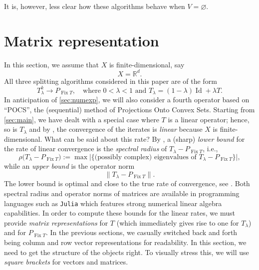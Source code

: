 \documentclass[11pt]{article}
\newcommand{\RR}{\ensuremath{\mathbb R}}
\newcommand{\Fix}{\ensuremath{\operatorname{Fix}}}
\newcommand{\Id}{\ensuremath{\operatorname{Id}}}
\theoremstyle{definition}
\providecommand{\RR}{\mathbb{R}}
\providecommand{\Id}{\operatorname{{ Id}}}
\providecommand{\Id}{\operatorname{Id}}
\providecommand{\RR}{\mathbb{R}}
\begin{document}
{It is, however, less clear how these algorithms  behave  when $V=\varnothing$. 

\section{Matrix representation}


\label{sec:matrix}

In this section, we assume that $X$ is finite-dimensional,
say 
\begin{equation*}
X=\RR^d.
\end{equation*}
All three splitting algorithms considered in this paper are of the form 
\begin{equation}
\label{e:210818a}
T_\lambda^k\to P_{\Fix T}, 
\quad\text{where $0<\lambda<1$ and $T_\lambda = (1-\lambda)\Id+\lambda T$.}%
\end{equation}
{\color{black} In anticipation of \cref{sec:numexp}, 
we will also consider a fourth operator based on ``POCS'', the (sequential) method of Projections Onto Convex Sets.}
Starting from \cref{sec:main}, we have dealt with a special case where 
$T$ is a linear operator; hence, so is $T_\lambda$ and 
by \cite[Corollary~2.8]{BLM}, the convergence of the iterates 
is \emph{linear} because $X$ is finite-dimensional. 
What can be said about this rate?
By \cite[Theorem~2.12(ii) and Theorem~2.18]{BBCNPW2}, a (sharp) 
\emph{lower bound} for the rate of linear 
convergence is the \emph{spectral radius} of $T_\lambda - P_{\Fix T}$, i.e., 
\begin{equation*}
\rho\big(T_\lambda- P_{\Fix T}\big) :=
\max \big|\{\text{(possibly complex) eigenvalues of $T_\lambda- P_{\Fix T}$}\}\big|,
\end{equation*}
while an \emph{upper bound} is the operator norm
\begin{equation*}
\big\|T_\lambda- P_{\Fix T}\big\|. 
\end{equation*}
The lower bound is optimal and close to the true rate of convergence, 
see \cite[Theorem~2.12(i)]{BBCNPW2}.
Both spectral radius and operator norms of matrices are available
in programming languages such as \texttt{Julia} \cite{Julia} which features 
strong numerical linear algebra capabilities.
In order to compute these bounds for the linear rates, 
we must provide \emph{matrix representations} 
for $T$ (which immediately gives rise to one for $T_\lambda$) 
and for $P_{\Fix T}$.
In the previous sections, we casually switched back and forth
being column and row vector representations for readability.
In this section, we need to get the structure of the objects right.
To visually stress this, we will use \emph{square brackets} for vectors and 
matrices.


}
\end{document}
